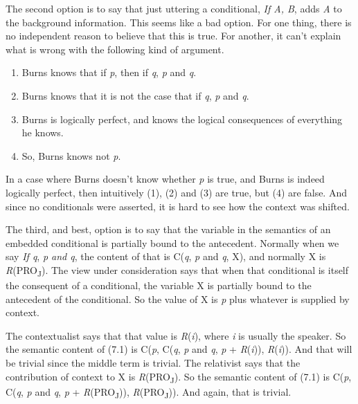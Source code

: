 \documentclass[
  10pt,
  letterpaper,
  DIV=11,
  numbers=noendperiod,
  twoside]{scrartcl}
\providecommand{\tightlist}{%
  \setlength{\itemsep}{0pt}\setlength{\parskip}{0pt}}\usepackage{longtable,booktabs,array}
\begin{document}
The second option is to say that just uttering a conditional, \emph{If
A, B}, adds \emph{A} to the background information. This seems like a
bad option. For one thing, there is no independent reason to believe
that this is true. For another, it can't explain what is wrong with the
following kind of argument.

\begin{enumerate}
\def\labelenumi{\arabic{enumi}.}
\tightlist
\item
  Burns knows that if \emph{p}, then if \emph{q}, \emph{p} and \emph{q}.
\item
  Burns knows that it is not the case that if \emph{q}, \emph{p} and
  \emph{q}.
\item
  Burns is logically perfect, and knows the logical consequences of
  everything he knows.
\item
  So, Burns knows not \emph{p}.
\end{enumerate}

In a case where Burns doesn't know whether \emph{p} is true, and Burns
is indeed logically perfect, then intuitively (1), (2) and (3) are true,
but (4) are false. And since no conditionals were asserted, it is hard
to see how the context was shifted.

The third, and best, option is to say that the variable in the semantics
of an embedded conditional is partially bound to the antecedent.
Normally when we say \emph{If q}, \emph{p and q}, the content of that is
C(\emph{q}, \emph{p} and \emph{q}, X), and normally X is
\emph{R}(PRO\textsubscript{J}). The view under consideration says that
when that conditional is itself the consequent of a conditional, the
variable X is partially bound to the antecedent of the conditional. So
the value of X is \emph{p} plus whatever is supplied by context.

The contextualist says that that value is \emph{R}(\emph{i}), where
\emph{i} is usually the speaker. So the semantic content of (7.1) is
C(\emph{p}, C(\emph{q}, \emph{p} and \emph{q}, \emph{p} +
\emph{R}(\emph{i})), \emph{R}(\emph{i})). And that will be trivial since
the middle term is trivial. The relativist says that the contribution of
context to X is \emph{R}(PRO\textsubscript{J}). So the semantic content
of (7.1) is C(\emph{p}, C(\emph{q}, \emph{p} and \emph{q}, \emph{p} +
\emph{R}(PRO\textsubscript{J})), \emph{R}(PRO\textsubscript{J})). And
again, that is trivial.
\end{document}
